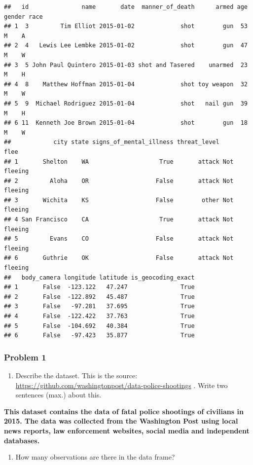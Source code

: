 \documentclass[
]{article}
\providecommand{\tightlist}{%
  \setlength{\itemsep}{0pt}\setlength{\parskip}{0pt}}
\begin{document}
\begin{verbatim}
##   id               name       date  manner_of_death      armed age gender race
## 1  3         Tim Elliot 2015-01-02             shot        gun  53      M    A
## 2  4   Lewis Lee Lembke 2015-01-02             shot        gun  47      M    W
## 3  5 John Paul Quintero 2015-01-03 shot and Tasered    unarmed  23      M    H
## 4  8    Matthew Hoffman 2015-01-04             shot toy weapon  32      M    W
## 5  9  Michael Rodriguez 2015-01-04             shot   nail gun  39      M    H
## 6 11  Kenneth Joe Brown 2015-01-04             shot        gun  18      M    W
##            city state signs_of_mental_illness threat_level        flee
## 1       Shelton    WA                    True       attack Not fleeing
## 2         Aloha    OR                   False       attack Not fleeing
## 3       Wichita    KS                   False        other Not fleeing
## 4 San Francisco    CA                    True       attack Not fleeing
## 5         Evans    CO                   False       attack Not fleeing
## 6       Guthrie    OK                   False       attack Not fleeing
##   body_camera longitude latitude is_geocoding_exact
## 1       False  -123.122   47.247               True
## 2       False  -122.892   45.487               True
## 3       False   -97.281   37.695               True
## 4       False  -122.422   37.763               True
## 5       False  -104.692   40.384               True
## 6       False   -97.423   35.877               True
\end{verbatim}

\hypertarget{problem-1-2}{%
\subsubsection{Problem 1}\label{problem-1-2}}

\begin{enumerate}
\def\labelenumi{\alph{enumi}.}
\tightlist
\item
  Describe the dataset. This is the source:
  \url{https://github.com/washingtonpost/data-police-shootings} . Write
  two sentences (max.) about this.
\end{enumerate}

\textbf{This dataset contains the data of fatal police shootings of
civilians in 2015. The data was collected from the Washington Post using
local news reports, law enforcement websites, social media and
independent databases.}

\begin{enumerate}
\def\labelenumi{\alph{enumi}.}
\setcounter{enumi}{1}
\tightlist
\item
  How many observations are there in the data frame?
\end{enumerate}
\end{document}
